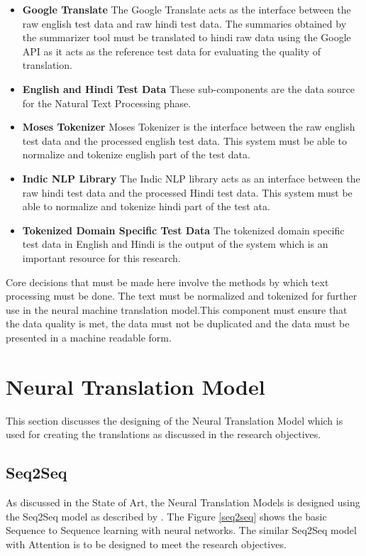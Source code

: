 \begin{itemize}
    \item \textbf{Google Translate} The Google Translate acts as the interface between the raw english test data and raw hindi test data. The summaries obtained by the summarizer tool must be translated to hindi raw data using the Google API as it acts as the reference test data for evaluating the quality of translation.
    \item \textbf{English and Hindi Test Data} These sub-components are the data source for the Natural Text Processing phase.
    \item \textbf{Moses Tokenizer} Moses Tokenizer is the interface between the raw english test data and the processed english test data. This system must be able to normalize and tokenize english part of the test data.
    \item \textbf{Indic NLP Library} The Indic NLP library acts as an interface between the raw hindi test data and the processed Hindi test data. This system must be able to normalize and tokenize hindi part of the test ata.
    \item\textbf{Tokenized Domain Specific Test Data} The tokenized domain specific test data in English and Hindi is the output of the system which is an important resource for this research.
\end{itemize}

Core decisions that must be made here involve the methods by which text processing must be done. The text must be normalized and tokenized for further use in the neural machine translation model.This component must ensure that the data quality is met, the data must not be duplicated and the data must be presented in a machine readable form.

\section{Neural Translation Model}

This section discusses the designing of the Neural Translation Model which is used for creating the translations as discussed in the research objectives. 

\subsection{Seq2Seq}
As discussed in the State of Art, the Neural Translation Models is designed using the Seq2Seq model as described by \cite{NIPS2014_5346}. The Figure \ref{seq2seq} shows the basic Sequence to Sequence learning with neural networks. The similar Seq2Seq model with Attention \citep{DBLP:journals/corr/BahdanauCB14} is to be designed to meet the research objectives.


